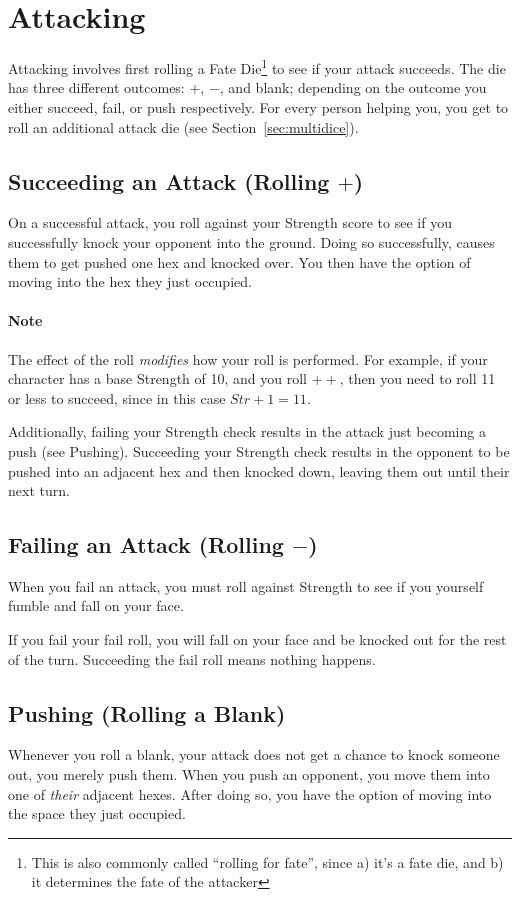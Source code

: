 \section{Attacking} \label{attacking}
Attacking involves first rolling a Fate Die\footnote{This is also commonly called ``rolling for fate'', since a) it's a fate die, and b) it determines the fate of the attacker} to see if your attack succeeds.
The die has three different outcomes: $+$, $-$, and blank; depending on the outcome you either succeed, fail, or push respectively.
For every person helping you, you get to roll an additional attack die (see Section~\ref{sec:multidice}).

\subsection{Succeeding an Attack (Rolling $+$)}
On a successful attack, you roll against your Strength score to see if you successfully knock your opponent into the ground.
Doing so successfully, causes them to get pushed one hex and knocked over.
You then have the option of moving into the hex they just occupied.

\paragraph{Note} The effect of the roll \textit{modifies} how your roll is performed.
For example, if your character has a base Strength of 10, and you roll $++$, then you need to roll 11 or less to succeed, since in this case $Str+1=11$.

Additionally, failing your Strength check results in the attack just becoming a push (see Pushing).
Succeeding your Strength check results in the opponent to be pushed into an adjacent hex and then knocked down, leaving them out until their next turn.

\subsection{Failing an Attack (Rolling $-$)}
When you fail an attack, you must roll against Strength to see if you yourself fumble and fall on your face.

If you fail your fail roll, you will fall on your face and be knocked out for the rest of the turn.
Succeeding the fail roll means nothing happens.

\subsection{Pushing (Rolling a Blank)}
Whenever you roll a blank, your attack does not get a chance to knock someone out, you merely push them.
When you push an opponent, you move them into one of \textit{their} adjacent hexes.
After doing so, you have the option of moving into the space they just occupied.

